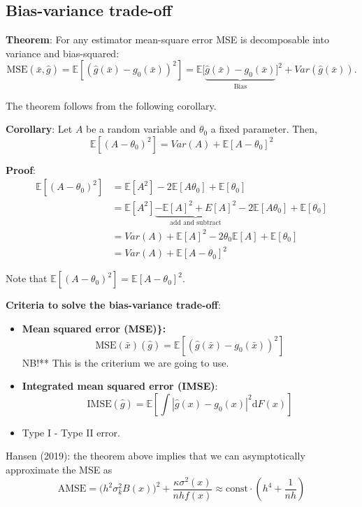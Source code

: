 \documentclass[12pt,]{book}
\begin{document}
\hypertarget{bias-variance-trade-off}{%
\subsection{Bias-variance trade-off}\label{bias-variance-trade-off}}

\textbf{Theorem}:
For any estimator mean-square error MSE is decomposable into variance and bias-squared:
\[
\text{MSE} (\bar{x}, \hat{g}) = \mathbb E \left[ \left( \hat{g}(\bar{x}) - g_0 (\bar{x}) \right)^2 \right] = \mathbb E \Big[\underbrace{ \hat{g}(\bar{x}) - g_0 (\bar{x}) }_{\text{Bias}} \Big]^2 +  Var (\hat{g} (\bar{x})). 
\]

The theorem follows from the following corollary.

\textbf{Corollary}:
Let \(A\) be a random variable and \(\theta_0\) a fixed parameter. Then,
\[
    \mathbb E [ (A - \theta_0)^2] = Var (A) + \mathbb E [A-\theta_0]^2
\]

\textbf{Proof}:
\[
  \begin{aligned}
    \mathbb E [ (A - \theta_0)^2] & = \mathbb E[A^2] - 2 \mathbb E [A \theta_0] + \mathbb E [\theta_0] \\
    &  = \mathbb E[A^2] \underbrace{-  \mathbb E[A]^2 + E[A]^2}_{\text{add and subtract}} - 2 \mathbb E [A \theta_0] + \mathbb E [\theta_0] \\
    &  = Var(A) + \mathbb E [A]^2 - 2 \theta_0 \mathbb E [A ] + \mathbb E [\theta_0] \\
    & = Var(A) + \mathbb E [A - \theta_0]^2
    \end{aligned}
\]

Note that \(\mathbb E [ (A - \theta_0)^2] = \mathbb E [A - \theta_0]^2\).
\[\tag*{$\blacksquare$}\]

\textbf{Criteria to solve the bias-variance trade-off}:

\begin{itemize}
\item
  \textbf{Mean squared error (MSE)\}:
  \[
    \text{MSE} (\bar{x}) (\hat{g}) = \mathbb E \left[ \left( \hat{g}(\bar{x}) - g_0 (\bar{x}) \right)^2 \right] 
  \]
  }NB!** This is the criterium we are going to use.
\item
  \textbf{Integrated mean squared error (IMSE)}:
  \[
    \text{IMSE} ( \hat{g} ) = \mathbb E \left[ \int | \hat{g} (x) - g_0 (x) |^2 \mathrm{d} F(x)  \right] 
  \]
\item
  Type I - Type II error.
\end{itemize}

Hansen (2019): the theorem above implies that we can asymptotically approximate the MSE as
\[
\text{AMSE} = \Big( h^2 \sigma_k^2 B(x) \Big)^2 + \frac{\kappa \sigma^2(x)}{nh f(x)} \approx \text{const} \cdot \left( h^4 + \frac{1}{n h} \right) 
\]
\end{document}
